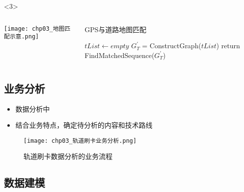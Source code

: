 \begin{frame}[t]{\subsecname}
\begin{overlayarea}{\textwidth}{\textheight}
  \begin{onlyenv}<3>
\begin{columns}
  \begin{column}{.4\textwidth}
\texttt{[image: chp03\_地图匹配示意.png]}
  \end{column}
  \begin{column}{.6\textwidth}
\begin{algorithm}[H] \tiny
     \DontPrintSemicolon 
     \caption*{GPS与道路地图匹配}
     \BlankLine    
     $tList \leftarrow empty$ 
     $G_T^'$ = ConstructGraph($tList$) 
     return FindMatchedSequence($G_T^'$)
\end{algorithm}
  \end{column}
\end{columns}
  \end{onlyenv}
\end{overlayarea}
\end{frame}

\subsection{业务分析}

\begin{frame}[t]{\subsecname}
\begin{itemize}
\item 数据分析中
\item 结合业务特点，确定待分析的内容和技术路线
\end{itemize}

\begin{figure}
  \centering
  \texttt{[image: chp03\_轨道刷卡业务分析.png]}
  \caption{轨道刷卡数据分析的业务流程}
\end{figure}
\end{frame}

\subsection{数据建模}

